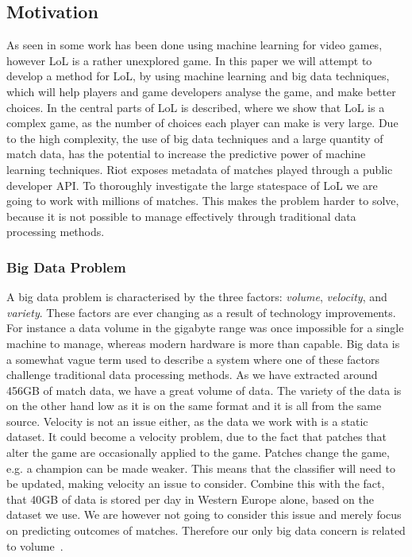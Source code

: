 \subsection{Motivation}\label{sec:motivation}
As seen in  some work has been done using machine learning for video games, however LoL is a rather unexplored game. 
In this paper we will attempt to develop a method for LoL, by using machine learning and big data techniques, which will help players and game developers analyse the game, and make better choices. In  the central parts of LoL is described, where we show that LoL is a complex game, as the number of choices each player can make is very large. Due to the high complexity, the use of big data techniques and a large quantity of match data, has the potential to increase the predictive power of machine learning techniques. Riot exposes metadata of matches played through a public developer API. To thoroughly investigate the large statespace of LoL we are going to work with millions of matches. This makes the problem harder to solve, because it is not possible to manage effectively through traditional data processing methods.

\subsubsection{Big Data Problem}\label{sec:big_data_problem}
A big data problem is characterised by the three factors: \emph{volume}, \emph{velocity}, and \emph{variety}. These factors are ever changing as a result of technology improvements. For instance a data volume in the gigabyte range was once impossible for a single machine to manage, whereas modern hardware is more than capable. Big data is a somewhat vague term used to describe a system where one of these factors challenge traditional data processing methods. As we have extracted around 456GB of match data, we have a great volume of data. The variety of the data is on the other hand low as it is on the same format and it is all from the same source. Velocity is not an issue either, as the data we work with is a static dataset. It could become a velocity problem, due to the fact that patches that alter the game are occasionally applied to the game. Patches change the game, e.g. a champion can be made weaker. This means that the classifier will need to be updated, making velocity an issue to consider. Combine this with the fact, that 40GB of data is stored per day in Western Europe alone, based on the dataset we use. We are however not going to consider this issue and merely focus on predicting outcomes of matches. Therefore our only big data concern is related to volume~\cite{madden2012databases}.

